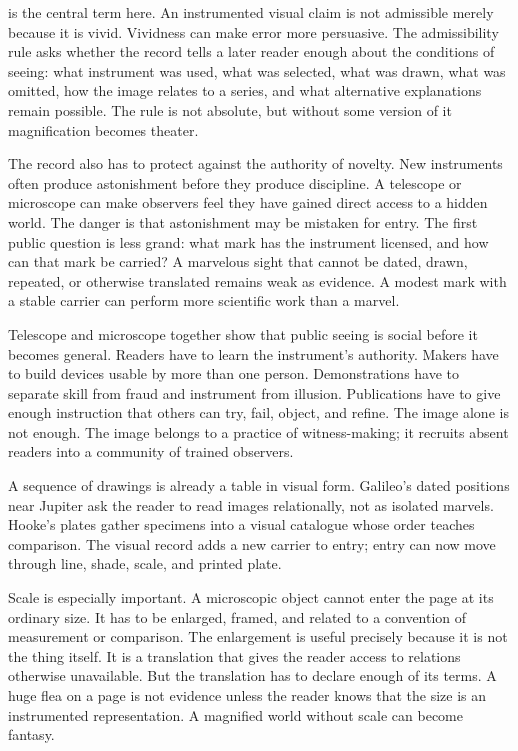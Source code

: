  is the central term here. An instrumented visual claim
is not admissible merely because it is vivid. Vividness can make error
more persuasive. The admissibility rule asks whether the record tells a
later reader enough about the conditions of seeing: what instrument was
used, what was selected, what was drawn, what was omitted, how the image
relates to a series, and what alternative explanations remain possible.
The rule is not absolute, but without some version of it magnification
becomes theater.

The record also has to protect against the authority of novelty. New
instruments often produce astonishment before they produce discipline. A
telescope or microscope can make observers feel they have gained direct
access to a hidden world. The danger is that astonishment may be mistaken
for entry. The first public question is less grand: what mark has the
instrument licensed, and how can that mark be carried? A marvelous sight
that cannot be dated, drawn, repeated, or otherwise translated remains
weak as evidence. A modest mark with a stable carrier can perform more
scientific work than a marvel.

Telescope and microscope together show that public seeing is social
before it becomes general. Readers have to learn the instrument's
authority. Makers have to build devices usable by more than one person.
Demonstrations have to separate skill from fraud and instrument from
illusion. Publications have to give enough instruction that others can
try, fail, object, and refine. The image alone is not enough. The image
belongs to a practice of witness-making; it recruits absent readers into
a community of trained observers.

A sequence of drawings is already a table in visual form. Galileo's
dated positions near Jupiter ask the reader to read images relationally,
not as isolated marvels. Hooke's plates gather specimens into a visual
catalogue whose order teaches comparison. The visual record adds a new
carrier to entry; entry can now move through line, shade, scale, and
printed plate.

Scale is especially important. A microscopic object cannot enter the
page at its ordinary size. It has to be enlarged, framed, and related to
a convention of measurement or comparison. The enlargement is useful
precisely because it is not the thing itself. It is a translation that
gives the reader access to relations otherwise unavailable. But the
translation has to declare enough of its terms. A huge flea on a page is
not evidence unless the reader knows that the size is an instrumented
representation. A magnified world without scale can become fantasy.

